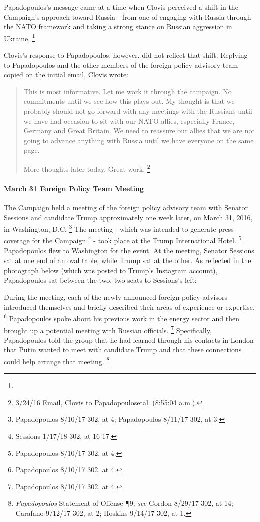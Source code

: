 Papadopoulos's message came at a time when Clovis perceived a shift in the Campaign's approach toward Russia - from one of engaging with Russia through the NATO framework and taking a strong stance on Russian aggression in Ukraine, %
\footnote{}

Clovis's response to Papadopoulos, however, did not reflect that shift.
Replying to Papadopoulos and the other members of the foreign policy advisory team copied on the initial email, Clovis wrote:

\begin{quote}
This is most informative.
Let me work it through the campaign.
No commitments until we see how this plays out.
My thought is that we probably should not go forward with any meetings with the Russians until we have had occasion to sit with our NATO allies, especially France, Germany and Great Britain.
We need to reassure our allies that we are not going to advance anything with Russia until we have everyone on the same page.

More thoughts later today.
Great work.%
\footnote{3/24/16 Email, Clovis to Papadopoulosetal. (8:55:04 a.m.).}
\end{quote}

\paragraph{March 31 Foreign Policy Team Meeting}

The Campaign held a meeting of the foreign policy advisory team with Senator Sessions and candidate Trump approximately one week later, on March 31, 2016, in Washington, D.C.%
\footnote{Papadopoulos 8/10/17 302, at 4; Papadopoulos 8/11/17 302, at 3.}
The meeting - which was intended to generate press coverage for the Campaign%
\footnote{Sessions 1/17/18 302, at 16-17.}
- took place at the Trump International Hotel.%
\footnote{Papadopoulos 8/10/17 302, at 4.}
Papadopoulos flew to Washington for the event.
At the meeting, Senator Sessions sat at one end of an oval table, while Trump sat at the other.
As reflected in the photograph below (which was posted to Trump's Instagram account), Papadopoulos sat between the two, two seats to Sessions's left:


During the meeting, each of the newly announced foreign policy advisors introduced themselves and briefly described their areas of experience or expertise.%
\footnote{Papadopoulos 8/10/17 302, at 4.}
Papadopoulos spoke about his previous work in the energy sector and then brought up a potential meeting with Russian officials.%
\footnote{Papadopoulos 8/10/17 302, at 4.}
Specifically, Papadopoulos told the group that he had learned through his contacts in London that Putin wanted to meet with candidate Trump and that these connections could help arrange that meeting.%
\footnote{\textit{Papadopoulos} Statement of Offense \P 9; \textit{see} Gordon 8/29/17 302, at 14; Carafano 9/12/17 302, at 2; Hoskins 9/14/17 302, at 1.}

